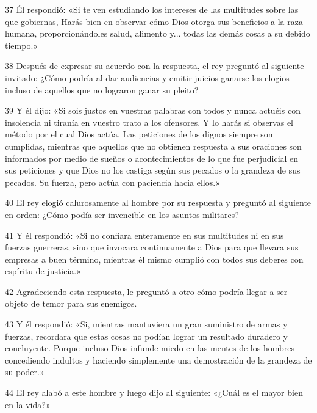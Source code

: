\par 37 Él respondió: «Si te ven estudiando los intereses de las multitudes sobre las que gobiernas, Harás bien en observar cómo Dios otorga sus beneficios a la raza humana, proporcionándoles salud, alimento y... todas las demás cosas a su debido tiempo.»

\par 38 Después de expresar su acuerdo con la respuesta, el rey preguntó al siguiente invitado: ¿Cómo podría al dar audiencias y emitir juicios ganarse los elogios incluso de aquellos que no lograron ganar su pleito?

\par 39 Y él dijo: «Si sois justos en vuestras palabras con todos y nunca actuéis con insolencia ni tiranía en vuestro trato a los ofensores. Y lo harás si observas el método por el cual Dios actúa. Las peticiones de los dignos siempre son cumplidas, mientras que aquellos que no obtienen respuesta a sus oraciones son informados por medio de sueños o acontecimientos de lo que fue perjudicial en sus peticiones y que Dios no los castiga según sus pecados o la grandeza de sus pecados. Su fuerza, pero actúa con paciencia hacia ellos.»

\par 40 El rey elogió calurosamente al hombre por su respuesta y preguntó al siguiente en orden: ¿Cómo podía ser invencible en los asuntos militares?

\par 41 Y él respondió: «Si no confiara enteramente en sus multitudes ni en sus fuerzas guerreras, sino que invocara continuamente a Dios para que llevara sus empresas a buen término, mientras él mismo cumplió con todos sus deberes con espíritu de justicia.»

\par 42 Agradeciendo esta respuesta, le preguntó a otro cómo podría llegar a ser objeto de temor para sus enemigos.

\par 43 Y él respondió: «Si, mientras mantuviera un gran suministro de armas y fuerzas, recordara que estas cosas no podían lograr un resultado duradero y concluyente. Porque incluso Dios infunde miedo en las mentes de los hombres concediendo indultos y haciendo simplemente una demostración de la grandeza de su poder.»

\par 44 El rey alabó a este hombre y luego dijo al siguiente: «¿Cuál es el mayor bien en la vida?»

